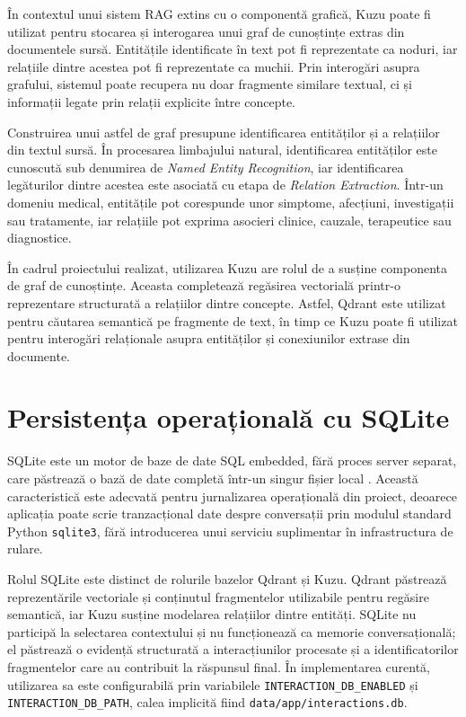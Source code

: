 \documentclass[12pt, a4paper, oneside, romanian]{teza-upb}
\begin{document}
În contextul unui sistem RAG extins cu o componentă grafică, Kuzu poate fi utilizat pentru stocarea și interogarea unui graf de cunoștințe extras din documentele sursă. Entitățile identificate în text pot fi reprezentate ca noduri, iar relațiile dintre acestea pot fi reprezentate ca muchii. Prin interogări asupra grafului, sistemul poate recupera nu doar fragmente similare textual, ci și informații legate prin relații explicite între concepte.

Construirea unui astfel de graf presupune identificarea entităților și a relațiilor din textul sursă. În procesarea limbajului natural, identificarea entităților este cunoscută sub denumirea de \textit{Named Entity Recognition}, iar identificarea legăturilor dintre acestea este asociată cu etapa de \textit{Relation Extraction}. Într-un domeniu medical, entitățile pot corespunde unor simptome, afecțiuni, investigații sau tratamente, iar relațiile pot exprima asocieri clinice, cauzale, terapeutice sau diagnostice.

În cadrul proiectului realizat, utilizarea Kuzu are rolul de a susține componenta de graf de cunoștințe. Aceasta completează regăsirea vectorială printr-o reprezentare structurată a relațiilor dintre concepte. Astfel, Qdrant este utilizat pentru căutarea semantică pe fragmente de text, în timp ce Kuzu poate fi utilizat pentru interogări relaționale asupra entităților și conexiunilor extrase din documente.

\section{Persistența operațională cu SQLite}

SQLite este un motor de baze de date SQL embedded, fără proces server separat, care păstrează o bază de date completă într-un singur fișier local \cite{sqlite_doc}. Această caracteristică este adecvată pentru jurnalizarea operațională din proiect, deoarece aplicația poate scrie tranzacțional date despre conversații prin modulul standard Python \texttt{sqlite3}, fără introducerea unui serviciu suplimentar în infrastructura de rulare.

Rolul SQLite este distinct de rolurile bazelor Qdrant și Kuzu. Qdrant păstrează reprezentările vectoriale și conținutul fragmentelor utilizabile pentru regăsire semantică, iar Kuzu susține modelarea relațiilor dintre entități. SQLite nu participă la selectarea contextului și nu funcționează ca memorie conversațională; el păstrează o evidență structurată a interacțiunilor procesate și a identificatorilor fragmentelor care au contribuit la răspunsul final. În implementarea curentă, utilizarea sa este configurabilă prin variabilele \texttt{INTERACTION\_DB\_ENABLED} și \texttt{INTERACTION\_DB\_PATH}, calea implicită fiind \texttt{data/app/interactions.db}.
\end{document}
